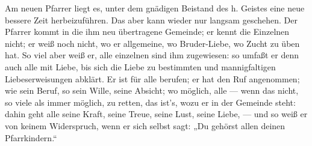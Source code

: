 Am neuen Pfarrer liegt es, unter dem gnädigen Beistand des h. Geistes eine neue bessere Zeit herbeizuführen. Das aber kann wieder nur langsam geschehen. Der Pfarrer kommt in die ihm neu übertragene Gemeinde; er kennt die Einzelnen nicht; er weiß noch nicht, wo er allgemeine, wo Bruder-Liebe, wo Zucht zu üben hat. So viel aber weiß er, alle einzelnen sind ihm zugewiesen: so umfaßt er denn auch alle mit Liebe, bis sich die Liebe zu bestimmten und mannigfaltigen Liebeserweisungen abklärt. Er ist für alle berufen; er hat den Ruf angenommen; wie sein Beruf, so sein Wille, seine Absicht; wo möglich, alle — wenn das nicht, so viele als immer möglich, zu retten, das ist’s, wozu er in der Gemeinde steht: dahin geht alle seine Kraft, seine Treue, seine Lust, seine Liebe, — und so weiß er von keinem Widerspruch, wenn er sich selbst sagt: „Du gehörst allen deinen Pfarrkindern.“

